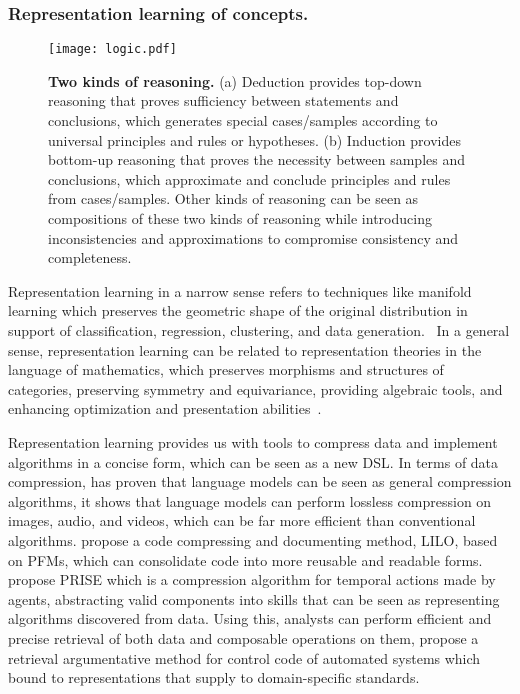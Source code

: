 \subsubsection{Representation learning of concepts.} \label{sec:representation}

\begin{figure*}[h]
  \centering
  \texttt{[image: logic.pdf]} %
  \caption{\textbf{Two kinds of reasoning.} (a) Deduction provides top-down reasoning that proves sufficiency between statements and conclusions, which generates special cases/samples according to universal principles and rules or hypotheses. (b) Induction provides bottom-up reasoning that proves the necessity between samples and conclusions, which approximate and conclude principles and rules from cases/samples. Other kinds of reasoning can be seen as compositions of these two kinds of reasoning while introducing inconsistencies and approximations to compromise consistency and completeness.}
  \label{fig:logic}
\end{figure*}

Representation learning in a narrow sense refers to techniques like manifold learning which preserves the geometric shape of the original distribution in support of classification, regression, clustering, and data generation.~\cite{buchholzrobustness, feyposition} In a general sense, representation learning can be related to representation theories in the language of mathematics, which preserves morphisms and structures of categories, preserving symmetry and equivariance, providing algebraic tools, and enhancing optimization and presentation abilities~\cite{yuan2023power, blaauwbroekgraph2tac, HansenCF24}. 

Representation learning provides us with tools to compress data and implement algorithms in a concise form, which can be seen as a new DSL. In terms of data compression, \cite{DeletangRDCGMGW24} has proven that language models can be seen as general compression algorithms, it shows that language models can perform lossless compression on images, audio, and videos, which can be far more efficient than conventional algorithms. \cite{GrandWBOLTA24} propose a code compressing and documenting method, LILO, based on PFMs, which can consolidate code into more reusable and readable forms. \cite{zhengprise} propose PRISE which is a compression algorithm for temporal actions made by agents, abstracting valid components into skills that can be seen as representing algorithms discovered from data. Using this, analysts can perform efficient and precise retrieval of both data and composable operations on them, \cite{KoziolekGHALE24} propose a retrieval argumentative method for control code of automated systems which bound to representations that supply to domain-specific standards. 

